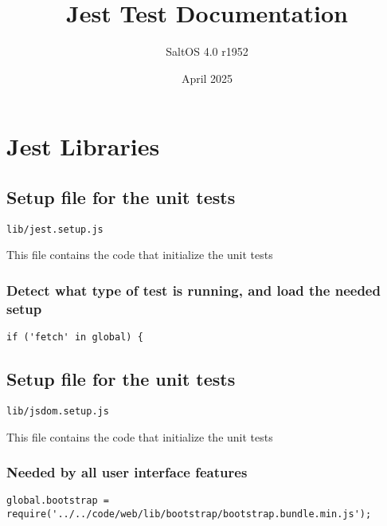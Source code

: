 \documentclass[a4paper]{article}
\title{Jest Test Documentation}
\author{SaltOS 4.0 r1952}
\begin{document}
\date{April 2025}
\maketitle
\clearpage

\tableofcontents
\clearpage


\hypertarget{toc1}{}
\section{Jest Libraries}

\hypertarget{toc2}{}
\subsection{Setup file for the unit tests}

\begin{lstlisting}
lib/jest.setup.js
\end{lstlisting}

This file contains the code that initialize the unit tests

\hypertarget{toc3}{}
\subsubsection{Detect what type of test is running, and load the needed setup}

\begin{lstlisting}
if ('fetch' in global) {
\end{lstlisting}

\hypertarget{toc4}{}
\subsection{Setup file for the unit tests}

\begin{lstlisting}
lib/jsdom.setup.js
\end{lstlisting}

This file contains the code that initialize the unit tests

\hypertarget{toc5}{}
\subsubsection{Needed by all user interface features}

\begin{lstlisting}
global.bootstrap = require('../../code/web/lib/bootstrap/bootstrap.bundle.min.js');
\end{lstlisting}
\end{document}
